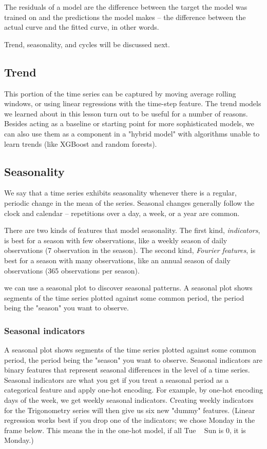 \documentclass[12pt]{report}
\begin{document}
The residuals of a model are the difference between the target the model was trained on and the predictions the model makes -- the difference between the actual curve and the fitted curve, in other words.


Trend, seasonality, and cycles will be discussed next.

\subsection{Trend}
This portion of the time series can be captured by moving average rolling windows, or using linear regressions with the time-step feature. The trend models we learned about in this lesson turn out to be useful for a number of reasons. Besides acting as a baseline or starting point for more sophisticated models, we can also use them as a component in a "hybrid model" with algorithms unable to learn trends (like XGBoost and random forests).

\subsection{Seasonality}
We say that a time series exhibits seasonality whenever there is a regular, periodic change in the mean of the series. Seasonal changes generally follow the clock and calendar -- repetitions over a day, a week, or a year are common.

There are two kinds of features that model seasonality. The first kind, \textit{indicators}, is best for a season with few observations, like a weekly season of daily observations (7 observation in the season). The second kind, \textit{Fourier features}, is best for a season with many observations, like an annual season of daily observations (365 observations per season).

we can use a seasonal plot to discover seasonal patterns. A seasonal plot shows segments of the time series plotted against some common period, the period being the "season" you want to observe.


\subsubsection{Seasonal indicators}
A seasonal plot shows segments of the time series plotted against some common period, the period being the "season" you want to observe. Seasonal indicators are binary features that represent seasonal differences in the level of a time series. Seasonal indicators are what you get if you treat a seasonal period as a categorical feature and apply one-hot encoding. For example, by one-hot encoding days of the week, we get weekly seasonal indicators. Creating weekly indicators for the Trigonometry series will then give us six new "dummy" features. (Linear regression works best if you drop one of the indicators; we chose Monday in the frame below. This means the in the one-hot model, if all Tue ~ Sun is 0, it is Monday.)
\end{document}
